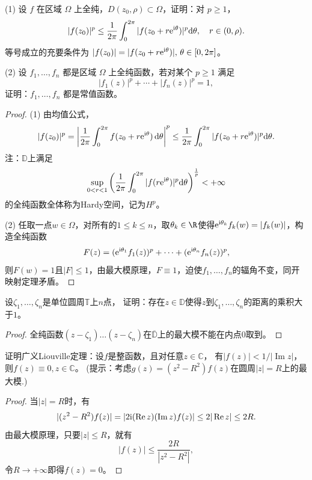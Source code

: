 \begin{4}
    (1) 设 $f$ 在区域 $\Omega$ 上全纯，$D(z_0,\rho) \subset \Omega$，证明：对 $p \geq 1$，
    $$|f(z_0)|^p \leq \frac{1}{2\pi} \int_0^{2\pi}|f(z_0+r{\rm e}^{{\rm i}\theta})|^p{\rm d}\theta, \quad r \in(0, \rho).$$
    等号成立的充要条件为 $|f(z_0)|=|f(z_0+r{\rm e}^{{\rm i}\theta})|,\,\theta\in[0,2\pi]$。

    (2) 设 $f_1, \ldots, f_n$ 都是区域 $\Omega$ 上全纯函数，若对某个 $p \geq 1$ 满足
    $$|f_1(z)|^p+\cdots+|f_n(z)|^p=1,$$
    证明：$f_1, \ldots, f_n$ 都是常值函数。
\end{4}
\begin{proof}
    (1) 由均值公式，
    \[|f(z_0)|^p = \left|\frac{1}{2\pi} \int_0^{2\pi}f(z_0+r{\rm e}^{{\rm i}\theta})\,{\rm d}\theta\right|^p
    \leq \frac{1}{2\pi} \int_0^{2\pi}|f(z_0+r{\rm e}^{{\rm i}\theta})|^p{\rm d}\theta.\]
    注：$\mathbb{D}$上满足\[\sup_{0<r<1}\left(\frac{1}{2\pi} \int_0^{2\pi}|f(r{\rm e}^{{\rm i}\theta})|^p{\rm d}\theta\right)^\frac{1}{p}<+\infty\]
    的全纯函数全体称为Hardy空间，记为$H^p$。

    (2) 任取一点$w\in\Omega$，对所有的$1 \le k \le n$，取$\theta_k\in\R$使得${\rm e}^{{\rm i}\theta_k}f_k(w)=|f_k(w)|$，构造全纯函数
    \[F(z)=({\rm e}^{{\rm i}\theta_1}f_1(z))^p+\cdots+({\rm e}^{{\rm i}\theta_n}f_n(z))^p,\]
    则$F(w)=1$且$|F|\le1$，由最大模原理，$F\equiv1$，迫使$f_1,\dots,f_n$的辐角不变，同开映射定理矛盾。
\end{proof}

\begin{6}
    设$\zeta_1,\dots,\zeta_n$是单位圆周$\mathbb{T}$上$n$点，
    证明：存在$z\in\mathbb{D}$使得$z$到$\zeta_1,\dots,\zeta_n$的距离的乘积大于$1$。
\end{6}
\begin{proof}
    全纯函数$(z-\zeta_1)\dots(z-\zeta_n)$在$\overline{\mathbb{D}}$上的最大模不能在内点$0$取到。
\end{proof}

\begin{8}
    证明广义Liouville定理：设$f$是整函数，且对任意$z\in\mathbb{C}$，
    有$|f(z)|<1/|\operatorname{Im}z|$，则$f(z)\equiv0,z\in\mathbb{C}$。
    (提示：考虑$g(z)=(z^2-R^2)f(z)$在圆周$|z|=R$上的最大模.)
\end{8}
\begin{proof}
    当$|z|=R$时，有
    \[|(z^2-R^2)f(z)|=|2{\rm i}(\operatorname{Re}z)(\operatorname{Im}z)f(z)|
    \le2|\operatorname{Re}z|\le2R.\]
    由最大模原理，只要$|z| \le R$，就有
    \[|f(z)|\le\frac{2R}{|z^2-R^2|},\]
    令$R\to+\infty$即得$f(z)=0$。
\end{proof}

